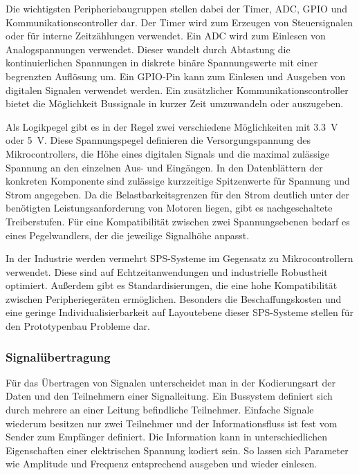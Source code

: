 Die wichtigsten Peripheriebaugruppen stellen dabei der Timer, ADC, GPIO und Kommunikationscontroller dar. Der Timer wird zum
Erzeugen von Steuersignalen oder für interne Zeitzählungen verwendet. Ein ADC wird zum Einlesen von Analogspannungen verwendet. Dieser
wandelt durch Abtastung die kontinuierlichen Spannungen in diskrete binäre Spannungswerte mit einer begrenzten Auflösung um. Ein
GPIO-Pin kann zum Einlesen und Ausgeben von digitalen Signalen verwendet werden. Ein zusätzlicher Kommunikationscontroller bietet
die Möglichkeit Bussignale in kurzer Zeit umzuwandeln oder auszugeben.

Als Logikpegel gibt es in der Regel zwei verschiedene Möglichkeiten mit \qty{3.3}{\volt} oder \qty{5}{\volt}. Diese Spannungspegel definieren die Versorgungspannung des
Mikrocontrollers, die Höhe eines digitalen Signals und die maximal zulässige Spannung an den einzelnen Aus- und Eingängen. In den
Datenblättern der konkreten Komponente sind zulässige kurzzeitige Spitzenwerte für Spannung und Strom angegeben. Da die Belastbarkeitsgrenzen
für den Strom deutlich unter der benötigten Leistungsanforderung von Motoren liegen, gibt es nachgeschaltete Treiberstufen.
Für eine Kompatibilität zwischen zwei Spannungsebenen bedarf es eines Pegelwandlers, der die jeweilige Signalhöhe anpasst.

In der Industrie werden vermehrt SPS-Systeme im Gegensatz zu Mikrocontrollern verwendet. Diese sind auf Echtzeitanwendungen
und industrielle Robustheit optimiert. Außerdem gibt es Standardisierungen, die eine hohe Kompatibilität zwischen
Peripheriegeräten ermöglichen. Besonders die Beschaffungskosten und eine geringe Individualisierbarkeit auf Layoutebene dieser SPS-Systeme stellen
für den Prototypenbau Probleme dar.

\subsubsection{Signalübertragung}
Für das Übertragen von Signalen unterscheidet man in der Kodierungsart der Daten und den Teilnehmern einer Signalleitung. Ein Bussystem
definiert sich durch mehrere an einer Leitung befindliche Teilnehmer. Einfache Signale wiederum besitzen nur zwei Teilnehmer und
der Informationsfluss ist fest vom Sender zum Empfänger definiert. Die Information kann in unterschiedlichen Eigenschaften einer
elektrischen Spannung kodiert sein. So lassen sich Parameter wie Amplitude und Frequenz entsprechend ausgeben und wieder einlesen.

